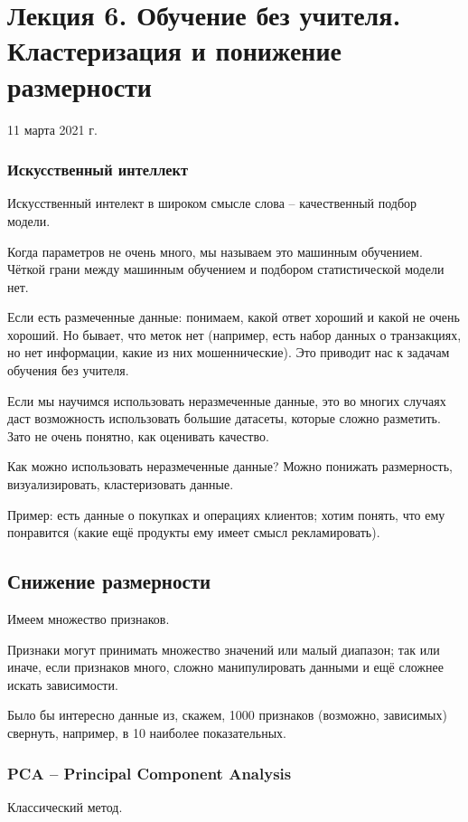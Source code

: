 \documentclass[main.tex]{subfiles}
\begin{document}
	
\section{ Лекция 6. Обучение без учителя. Кластеризация и понижение размерности }
11 марта 2021 г.

\subsubsection{Искусственный интеллект}

Искусственный интелект в широком смысле слова -- качественный подбор модели.

Когда параметров не очень много, мы называем это машинным обучением.
Чёткой грани между машинным обучением и подбором статистической модели нет.

Если есть размеченные данные: понимаем, какой ответ хороший и какой не очень хороший.
Но бывает, что меток нет (например, есть набор данных о транзакциях, но нет информации, какие из них мошеннические).
Это приводит нас к задачам обучения без учителя.

Если мы научимся использовать неразмеченные данные, это во многих случаях даст возможность использовать большие датасеты, которые сложно разметить.
Зато не очень понятно, как оценивать качество.

Как можно использовать неразмеченные данные?
Можно понижать размерность, визуализировать, кластеризовать данные.

Пример: есть данные о покупках и операциях клиентов; хотим понять, что ему понравится (какие ещё продукты ему имеет смысл рекламировать).

\subsection{Снижение размерности }
Имеем множество признаков.

Признаки могут принимать множество значений или малый диапазон; так или иначе, если признаков много, сложно манипулировать данными и ещё сложнее искать зависимости.

Было бы интересно данные из, скажем, 1000 признаков (возможно, зависимых) свернуть, например, в 10 наиболее показательных.

\subsubsection{PCA -- Principal Component Analysis}

Классический метод.
\end{document}
